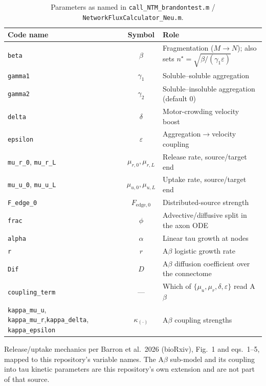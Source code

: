 ﻿\documentclass[11pt]{article}
\begin{document}
\begin{table}[h]
\centering
\caption{Parameters as named in \texttt{call\_NTM\_brandontest.m} / \texttt{NetworkFluxCalculator\_Neu.m}.}
\begin{tabularx}{\textwidth}{@{} p{3.6cm} c X @{}}
\toprule
Code name & Symbol & Role \\
\midrule
\texttt{beta} & $\beta$ & Fragmentation ($M\to N$); also sets $n^\star=\sqrt{\beta/(\gamma_1\varepsilon)}$ \\
\texttt{gamma1} & $\gamma_1$ & Soluble--soluble aggregation \\
\texttt{gamma2} & $\gamma_2$ & Soluble--insoluble aggregation (default $0$) \\
\texttt{delta} & $\delta$ & Motor-crowding velocity boost \\
\texttt{epsilon} & $\varepsilon$ & Aggregation$\to$velocity coupling \\
\texttt{mu\_r\_0}, \texttt{mu\_r\_L} & $\mu_{r,0},\mu_{r,L}$ & Release rate, source/target end \\
\texttt{mu\_u\_0}, \texttt{mu\_u\_L} & $\mu_{u,0},\mu_{u,L}$ & Uptake rate, source/target end \\
\texttt{F\_edge\_0} & $F_{\mathrm{edge},0}$ & Distributed-source strength \\
\texttt{frac} & $\phi$ & Advective/diffusive split in the axon ODE \\
\texttt{alpha} & $\alpha$ & Linear tau growth at nodes \\
\texttt{r} & $r$ & A$\beta$ logistic growth rate \\
\texttt{Dif} & $D$ & A$\beta$ diffusion coefficient over the connectome \\
\texttt{coupling\_term} & --- & Which of $\{\mu_u,\mu_r,\delta,\varepsilon\}$ read A$\beta$ \\
\texttt{kappa\_mu\_u}, \texttt{kappa\_mu\_r},\newline\texttt{kappa\_delta}, \texttt{kappa\_epsilon} & $\kappa_{(\cdot)}$ & A$\beta$ coupling strengths \\
\bottomrule
\end{tabularx}
\end{table}

\vspace{1em}
{\footnotesize Release/uptake mechanics per Barron et al.\ 2026 (bioRxiv), Fig.~1 and eqs.~1--5,
mapped to this repository's variable names. The A$\beta$ sub-model and its
coupling into tau kinetic parameters are this repository's own extension and
are not part of that source.}
\end{document}
